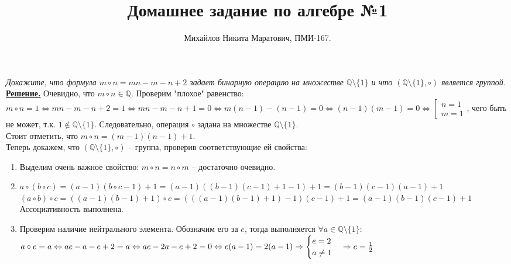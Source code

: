 \documentclass[14pt,a4paper]{scrartcl}
\title{
     Домашнее задание по алгебре №1\\
 }
\author{Михайлов Никита Маратович, ПМИ-167.\\
}
\date{}
\begin{document}
\maketitle
\begin{spacing}{1}

\begin{center}
\end{center}
\textit{Докажите, что формула $m \circ n = mn - m - n + 2$ задает бинарную операцию на множестве $\mathbb{Q}\setminus \{1\}$ и что $(\mathbb{Q}\setminus\{1\}, \circ)$ является группой.} \\
\noindent \textbf{\underline{Решение.}} Очевидно, что $m \circ n \in \mathbb{Q}$. Проверим "плохое" равенство: \\
$m \circ n = 1 \Leftrightarrow mn - m - n + 2 = 1 \Leftrightarrow mn - m - n + 1 = 0 \Leftrightarrow m(n - 1) - (n - 1) = 0 \Leftrightarrow (n - 1)(m - 1) = 0 \Leftrightarrow 
\left[\begin{array}{l}
	 n = 1 \\
	 m = 1
\end{array}\right.$, чего быть не может, т.к. $1 \notin \mathbb{Q}\setminus\{1\}$. Следовательно, операция $\circ$ задана на множестве $\mathbb{Q} \setminus \{1\}$. \\
Стоит отметить, что $m \circ n = (m - 1)(n - 1) + 1$.\\
Теперь докажем, что $(\mathbb{Q}\setminus\{1\}, \circ)$ -- группа, проверив соответствующие ей свойства:
\begin{enumerate}
	\item Выделим очень важное свойство: $m \circ n = n \circ m$ -- достаточно очевидно.
	\item $ a \circ (b \circ c) = (a - 1)(b \circ c - 1) + 1 = (a - 1)((b - 1)(c - 1) + 1 - 1) + 1 = (b - 1)(c - 1)(a - 1) + 1$\\
	$(a \circ b) \circ c = ((a - 1)(b - 1) + 1)\circ c =  (((a - 1)(b - 1) + 1) - 1)(c - 1) + 1 = (a - 1)(b - 1)(c - 1) + 1$\\
	Ассоциативность выполнена.
	\item Проверим наличие нейтрального элемента. Обозначим его за $e$, тогда выполняется $\forall a \in \mathbb{Q}\setminus{\{1\}}$: $a \circ e = a \Leftrightarrow ae - a - e + 2 = a \Leftrightarrow  \\ ae - 2a - e + 2 = 0 \Leftrightarrow e(a - 1) = 2(a - 1) \Rightarrow 
	\begin{cases}
	e = 2\\
	a \neq 1
	\end{cases} \Rightarrow e = \frac12$

\end{enumerate}
\end{spacing}
\end{document}
